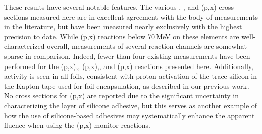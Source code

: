 These results have several notable features.
The various , , and (p,x) cross sections measured here are in excellent agreement with the body of measurements in the literature,  but have been measured nearly exclusively with the highest precision to date.
While (p,x) reactions below 70\,MeV on these elements are well-characterized overall, measurements of several reaction channels are somewhat sparse in comparison.
Indeed, fewer than four existing measurements have been performed for the (p,x),, (p,x),, and (p,x)
reactions presented here.
Additionally,  activity is seen in all foils, consistent with proton activation of the trace  silicon in the Kapton tape used for foil encapsulation, as described in our previous work\,\cite{Voyles2018a}.
No cross sections for (p,x) are reported due to the significant uncertainty in characterizing the layer of silicone adhesive, but this serves as another example of how the use of silicone-based adhesives may systematically enhance the apparent fluence when using the (p,x) monitor reactions.


